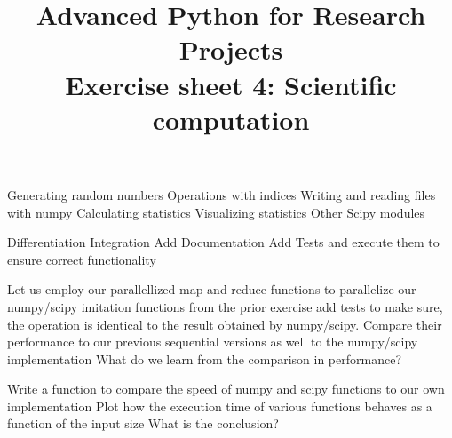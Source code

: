 \documentclass[]{erlangen-problemset}
\title{{\Large Advanced Python for Research Projects} \\[0.3cm] 
Exercise sheet 4: Scientific computation}
\begin{document}


\begin{problem}[title={Using numpy and scipy for scientific calculation}]
\noindent
\Question Generating random numbers
\Question Operations with indices
\Question Writing and reading files with numpy
\Question Calculating statistics
\Question Visualizing statistics
\Question Other Scipy modules
\end{problem}

\begin{problem}[title={Rebuilding numpy and scipy functionality ourselves}]
\noindent
\Question Differentiation
\Question Integration
\Question Add Documentation
\Question Add Tests and execute them to ensure correct functionality
\end{problem}

\begin{problem}[title={Parallel numpy/scipy replacement}]
\noindent
\Question Let us employ our parallellized map and reduce functions to parallelize our numpy/scipy imitation functions from the prior exercise
\Question add tests to make sure, the operation is identical to the result obtained by numpy/scipy.
\Question Compare their performance to our previous sequential versions as well to the numpy/scipy implementation
\Question What do we learn from the comparison in performance?
\end{problem}

\begin{problem}[title={Measuring performance}]
\noindent
\Question Write a function to compare the speed of numpy and scipy functions to our own implementation
\Question Plot how the execution time of various functions behaves as a function of the input size
\Question What is the conclusion?
\end{problem}
\end{document}
